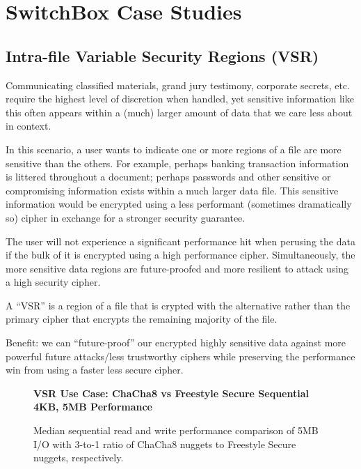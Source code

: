 \section{SwitchBox Case Studies}\label{sec:usecases}

\subsection{Intra-file Variable Security Regions (VSR)}

Communicating classified materials, grand jury testimony, corporate secrets,
etc. require the highest level of discretion when handled, yet sensitive
information like this often appears within a (much) larger amount of data that
we care less about in context.

In this scenario, a user wants to indicate one or more regions of a file are
more sensitive than the others. For example, perhaps banking transaction
information is littered throughout a document; perhaps passwords and other
sensitive or compromising information exists within a much larger data file.
This sensitive information would be encrypted using a less performant (sometimes
dramatically so) cipher in exchange for a stronger security guarantee.

The user will not experience a significant performance hit when perusing the
data if the bulk of it is encrypted using a high performance cipher.
Simultaneously, the more sensitive data regions are future-proofed and more
resilient to attack using a high security cipher.

A ``VSR'' is a region of a file that is crypted with the alternative rather than
the primary cipher that encrypts the remaining majority of the file.

Benefit: we can ``future-proof'' our encrypted highly sensitive data against
more powerful future attacks/less trustworthy ciphers while preserving the
performance win from using a faster less secure cipher.

\begin{figure}[ht] \textbf{VSR Use Case: ChaCha8 vs Freestyle Secure Sequential
4KB, 5MB Performance}\par\medskip
   \centering
   {} \caption{Median sequential read and
   write performance comparison of 5MB I/O with 3-to-1 ratio of ChaCha8 nuggets
   to Freestyle Secure nuggets, respectively.}
  \label{fig:usecase-vsr-bar}
\end{figure}


